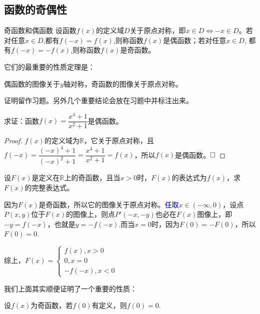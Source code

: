 \documentclass[lang=cn,math=cm,chinesefont=nofont,11pt,scheme=chinese,twocol]{elegantbook}
\begin{document}
\subsection{函数的奇偶性}

\begin{definition}{奇函数和偶函数}
  设函数$f(x)$的定义域$D$关于原点对称，即$x\in D\Leftrightarrow-x\in D$。若对任意$x\in D$,都有$f(-x)=f(x)$,则称函数$f(x)$是偶函数；若对任意$x\in D$, 都有$f(-x)=-f(x)$,则称函数$f(x)$是奇函数。
\end{definition}

它们的最重要的性质定理是：

\begin{property}
  偶函数的图像关于$y$轴对称，奇函数的图像关于原点对称。
\end{property}

证明留作习题。另外几个重要结论会放在习题中并标注出来。

\begin{example}
  求证：函数$f(x)=\dfrac{x^{4}+1}{x^{2}+1}$是偶函数。
\end{example}

\begin{proof}
  $f(x)$的定义域为$\mathbb{R}$，它关于原点对称，且$f(-x)=\dfrac{(-x)^{4}+1}{(-x)^{2}+1}=\dfrac{x^{4}+1}{x^{2}+1}=f(x)$，所以$f(x)$是偶函数。$\hfill\square$
\end{proof}

\begin{example}
  设$F(x)$是定义在$\mathbb{R}$上的奇函数，且当$x>0$时，$F(x)$的表达式为$f(x)$，求$F(x)$的完整表达式。
\end{example}

\begin{solution}
  因为$F(x)$是奇函数，所以它的图像关于原点对称。\textcolor{blue}{任取}$x\in(-\infty,0)$，设点$P(x,y)$位于$F(x)$的图像上，则点$P'(-x,-y)$也必在$F(x)$图像上，即$-y=f(-x)$，也就是$y=-f(-x)$.而当$x=0$时，因为$F(0)=-F(0)$，所以$F(0)=0$.

  综上，$F(x)=
  \begin{cases}
    f(x),x>0
    \\0,x=0
    \\-f(-x),x<0
  \end{cases}$
\end{solution}

我们上面其实顺便证明了一个重要的性质：

\begin{property}
  设$f(x)$为奇函数，若$f(0)$有定义，则$f(0)=0$.
\end{property}
\end{document}
